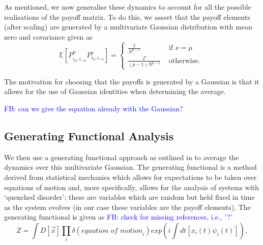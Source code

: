 \documentclass[sigconf,anonymous]{aamas}
\newcommand{\payoff}[2]{P^{#2}_{#1_#2, #1_{-#2}}}
\newcommand\fb[1]{\textcolor{blue}{FB: #1}}
\begin{document}
As mentioned, we now
generalise these dynamics to account for all the possible realisations
of the payoff matrix. To do this, we assert that the payoff elements
(after scaling) are generated by a multivariate Gaussian distribution
with mean zero and covariance given as
%
\begin{equation}
\label{eqn::Payoffs}
        \mathbb{E}\left [ \payoff{i}{\mu} \payoff{i}{\nu} \right] = \begin{cases}
        \frac{1}{N^{p-1}} &  \text{ if } \nu = \mu \\
        \frac{\Gamma}{(p-1) N^{p-1}} & \text{ otherwise. }
        \end{cases}
\end{equation}

The motivation for choosing that the payoffs is generated by a
Gaussian is that it allows for the use of Gaussian identities when
determining the average.

\fb{can we give the equation already with the Gaussian?}

\subsection{Generating Functional Analysis}

We then use a generating functional approach as outlined in
\cite{Mezard1986} to average the dynamics over this multivariate
Gaussian. The generating functional is a method derived from
statistical mechanics which allows for expectations to be taken over
equations of motion and, more specifically, allows for the analysis of
systems with `quenched disorder': these are
variables which are random but held fixed in time as the system
evolves (in our case these variables are the payoff elements). The
generating functional is given as \cite{SpinGlassTheory}
%
\fb{check for missing references, i.e., '?'}
\begin{equation}
	Z = \int D[\Vec{x}] \prod_i \delta(\textit{equation of motion}_i) exp(i
	\int dt[x_i(t) \psi_i(t)]), 
\end{equation}
\end{document}

